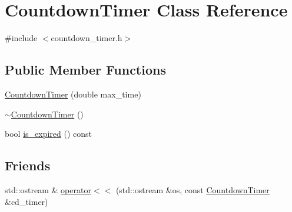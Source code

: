 \hypertarget{classCountdownTimer}{\section{Countdown\-Timer Class Reference}
\label{classCountdownTimer}
}


{\ttfamily \#include $<$countdown\-\_\-timer.\-h$>$}

\subsection*{Public Member Functions}
\begin{DoxyCompactItemize}
\item 
\hyperlink{classCountdownTimer_a2fe33274e8b0613547e74fcbb182db0e}{Countdown\-Timer} (double max\-\_\-time)
\item 
\hyperlink{classCountdownTimer_a1cd608b370250db65416ce824e2ad092}{$\sim$\-Countdown\-Timer} ()
\item 
bool \hyperlink{classCountdownTimer_a11351f52bb11757af4264f59c1f6c144}{is\-\_\-expired} () const 
\end{DoxyCompactItemize}
\subsection*{Friends}
\begin{DoxyCompactItemize}
\item 
std\-::ostream \& \hyperlink{classCountdownTimer_a2407f49edc80534d80cb2bd37a74eae9}{operator$<$$<$} (std\-::ostream \&os, const \hyperlink{classCountdownTimer}{Countdown\-Timer} \&cd\-\_\-timer)
\end{DoxyCompactItemize}


